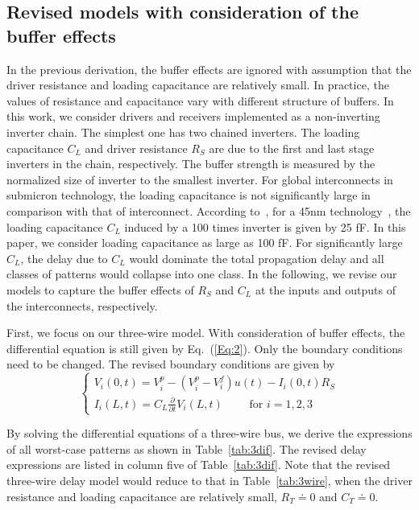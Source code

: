 \documentclass[10pt,journal]{IEEEtran}
\begin{document}
\subsection{Revised models with consideration of the buffer effects}
\label{sec:revised}
In the previous derivation, the buffer effects are ignored with assumption that the driver resistance and loading capacitance are relatively small. In practice, the values of resistance and capacitance vary with different structure of buffers.
In this work, we consider drivers and receivers implemented as a non-inverting inverter chain. The simplest one has two chained inverters. The loading capacitance $C_L$ and driver resistance $R_S$ are due to the first and last stage inverters in the chain, respectively.
The buffer strength is measured by the normalized size of inverter to the smallest inverter.
For global interconnects in submicron technology, the loading capacitance is not significantly large in comparison with that of interconnect. According to~\cite{ANRS_TCASI08}, for a 45nm technology~\cite{FreePDK45}, the loading capacitance $C_L$ induced by a 100 times inverter is given by 25 fF. In this paper, we consider loading capacitance as large as 100 fF. For significantly large $C_L$, the delay due to $C_L$ would dominate the total propagation delay and all classes of patterns would collapse into one class.
In the following, we revise our models to capture the buffer effects of $R_S$ and $C_L$ at the inputs and outputs of the interconnects, respectively.




First, we focus on our three-wire model. With consideration of buffer effects, the differential equation is still given by Eq.~(\ref{Eq:2}). Only the boundary conditions need to be changed. The revised boundary conditions are given by
\begin{equation*}
\left\{\begin{array}{l}
V_i(0,t) = V_i^p-(V_i^p-V_i^f) u(t)-I_i(0,t) R_S \\
I_i(L,t)=C_L \frac{\partial}{\partial t}V_i(L,t) \quad\quad \mbox{ for } i=1,2,3
\end{array}  \right.
\end{equation*}


By solving the differential equations of a three-wire bus, we derive the expressions of all worst-case patterns as shown in Table~\ref{tab:3dif}.
The revised delay expressions are listed in column five of Table~\ref{tab:3dif}.
Note that the revised three-wire delay model would reduce to that in Table~\ref{tab:3wire}, when the driver resistance and loading capacitance are relatively small, $R_T \doteq 0$ and $C_T \doteq 0$.
\end{document}
